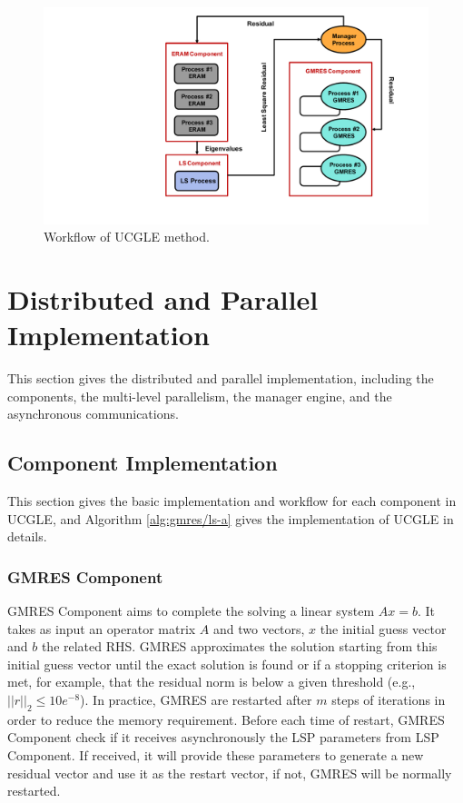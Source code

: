 \begin{figure}[t]
	\centering
	\includegraphics[width=0.99\linewidth]{fig/workflow.pdf}
	\caption{Workflow of UCGLE method.}
	\label{fig:worflow}
\end{figure}


\section{Distributed and Parallel Implementation}\label{Distributed and Parallel Implementation}

This section gives the distributed and parallel implementation, including the components, the multi-level parallelism, the manager engine, and the asynchronous communications.

\subsection{Component Implementation}

This section gives the basic implementation and workflow for each component in UCGLE, and Algorithm \ref{alg:gmres/ls-a} gives the implementation of UCGLE in details.

\subsubsection{GMRES Component}

GMRES Component aims to complete the solving a linear system $Ax=b$. It takes as input an operator matrix $A$ and two vectors, $x$ the initial guess vector and $b$ the related RHS. GMRES approximates the solution starting from this initial guess vector until the exact solution is found or if a stopping criterion is met, for example, that the residual norm is below a given threshold (e.g., $||r||_2 \leq 10e^{-8}$). In practice, GMRES are restarted after $m$ steps of iterations in order to reduce the memory requirement. Before each time of restart, GMRES Component check if it receives asynchronously the LSP parameters from LSP Component. If received, it will provide these parameters to generate a new residual vector and use it as the restart vector, if not, GMRES will be normally restarted. 

